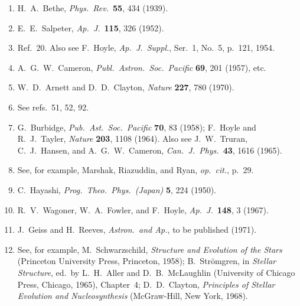 \begin{enumerate}
  \item{}\label{ch15-ref-102}
  H.~A.~Bethe, \emph{Phys.\ Rev.}\ \textbf{55}, 434 (1939).

  \item{}\label{ch15-ref-103}
  E.~E.~Salpeter, \emph{Ap.\ J.}\ \textbf{115}, 326 (1952).

  \item{}\label{ch15-ref-104}
  Ref.~20. Also see F.~Hoyle,
  \emph{Ap.\ J.\ Suppl.}, Ser.~1, No.~5, p.~121, 1954.

  \item{}\label{ch15-ref-105}
  A.~G.~W.~Cameron,
  \emph{Publ.\ Astron.\ Soc.\ Pacific} \textbf{69}, 201 (1957), etc.

  \item{}\label{ch15-ref-106}
  W.~D.~Arnett and D.~D.~Clayton,
  \emph{Nature} \textbf{227}, 780 (1970).

  \item{}\label{ch15-ref-107}
  See refs.~51, 52, 92.

  \item{}\label{ch15-ref-108}
  G.~Burbidge, \emph{Pub.\ Ast.\ Soc.\ Pacific} \textbf{70}, 83 (1958);
  F.~Hoyle and R.~J.~Tayler, \emph{Nature} \textbf{203}, 1108 (1964).
  Also see J.~W.~Truran, C.~J.~Hansen, and A.~G.~W.~Cameron,
  \emph{Can.\ J.\ Phys.}\ \textbf{43}, 1616 (1965).

  \item{}\label{ch15-ref-109}
  See, for example, Marshak, Riazuddin, and Ryan,
  \emph{op.\ cit.}, p.~29.

  \item[109a.]\label{ch15-ref-109a}
  C.~Hayashi, \emph{Prog.\ Theo.\ Phys.\ (Japan)} \textbf{5}, 224 (1950).

  \item{}\label{ch15-ref-110}
  R.~V.~Wagoner, W.~A.~Fowler, and F.~Hoyle,
  \emph{Ap.\ J.}\ \textbf{148}, 3 (1967).

  \item[110a.]\label{ch15-ref-110a}
  J.~Geiss and H.~Reeves, \emph{Astron.\ and Ap.},
  to be published (1971).

  \item{}\label{ch15-ref-111}
  See, for example, M.~Schwarzschild,
  \emph{Structure and Evolution of the Stars}
  (Princeton University Press, Princeton, 1958);
  B.~Str\"omgren, in \emph{Stellar Structure},
  ed.\ by L.~H.~Aller and D.~B.~McLaughlin
  (University of Chicago Press, Chicago, 1965), Chapter~4;
  D.~D.~Clayton, \emph{Principles of Stellar Evolution and Nucleosynthesis}
  (McGraw-Hill, New York, 1968).


\end{enumerate}
